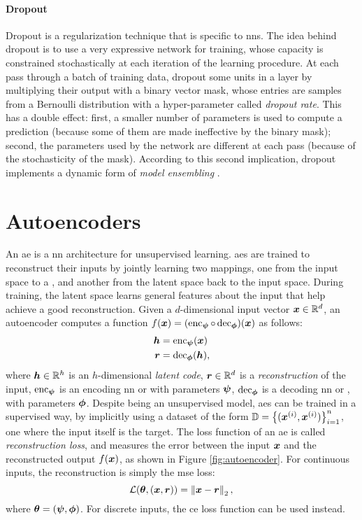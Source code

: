 \paragraph{Dropout}
Dropout \citep{srivastava2014dropout} is a regularization technique that is specific to \glspl{nn}. The idea behind dropout is to use a very expressive network for training, whose capacity is constrained stochastically at each iteration of the learning procedure. At each pass through a batch of training data, dropout  some units in a layer by multiplying their output with a binary vector mask, whose entries are samples from a Bernoulli distribution with a hyper-parameter called \emph{dropout rate}. This has a double effect: first, a smaller number of parameters is used to compute a prediction (because some of them are made ineffective by the binary mask); second, the parameters used by the network are different at each pass (because of the stochasticity of the mask). According to this second implication, dropout implements a dynamic form of \emph{model ensembling} \citep{ghahramani2016dropout}.

\section{Autoencoders}\label{sec:autoencoders}
An \gls{ae} \citep{baldi2012autoenc} is a \gls{nn} architecture for unsupervised learning. \glspl{ae} are trained to reconstruct their inputs by jointly learning two mappings, one from the input space to a , and another from the latent space back to the input space. During training, the latent space learns general features about the input that help achieve a good reconstruction. Given a $d$-dimensional input vector $\Vector{x} \in \Real^d$, an autoencoder computes a function $f(\Vector{x}) = (\EncoderNet \circ \DecoderNet)(\Vector{x})$ as follows:
\begin{align*}
    \Vector{h} &= \EncoderNet(\Vector{x})\\
    \Vector{r} &= \DecoderNet(\Vector{h}),
\end{align*}
where $\Vector{h} \in \Real^h$ is an $h$-dimensional \emph{latent code}, $\Vector{r} \in \Real^d$ is a \emph{reconstruction} of the input, $\operatorname{enc}_{\boldsymbol{\psi}}$ is an encoding \gls{nn} or  with parameters $\boldsymbol{\psi}$, $\operatorname{dec}_{\boldsymbol{\phi}}$ is a decoding \gls{nn} or , with parameters $\boldsymbol{\phi}$. Despite being an unsupervised model, \glspl{ae} can be trained in a supervised way, by implicitly using a dataset of the form $\Data = \Set{(\PatternVector{x}{i}, \PatternVector{x}{i})}_{i=1}^n$, \ie one where the input itself is the target. The loss function of an \gls{ae} is called \emph{reconstruction loss}, and measures the error between the input $\Vector{x}$ and the reconstructed output $f(\Vector{x})$, as shown in Figure \ref{fig:autoencoder}. For continuous inputs, the reconstruction is simply the \gls{mse} loss:
$$\Loss(\Param, (\Vector{x}, \Vector{r})) = \Norm{\Vector{x}-\Vector{r}}_2,$$
where $\boldsymbol{\theta} = (\boldsymbol{\psi}, \boldsymbol{\phi})$. For discrete inputs, the \gls{ce} loss function can be used instead.

